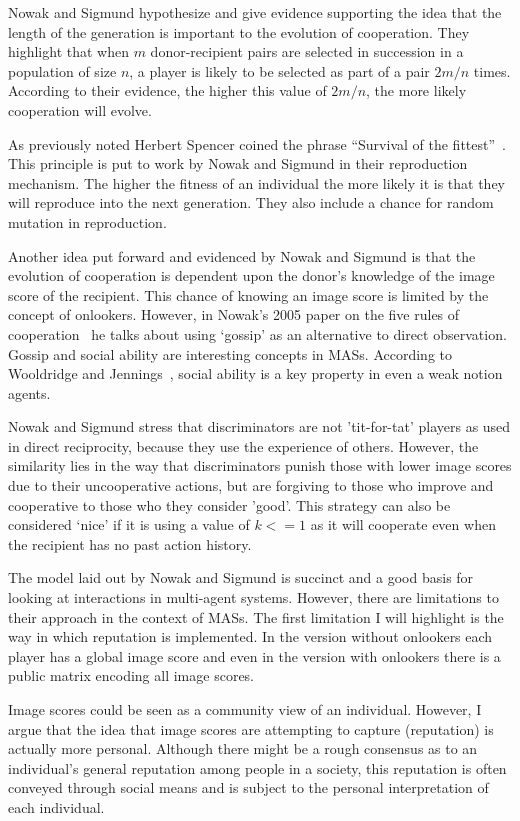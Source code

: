 \documentclass[]{final_report}
\begin{document}
Nowak and Sigmund hypothesize and give evidence supporting the idea that the length of the generation is important to the evolution of cooperation. They highlight that when $m$ donor-recipient pairs are selected in succession in a population of size $n$, a player is likely to be selected as part of a pair $2m/n$ times. According to their evidence, the higher this value of $2m/n$, the more likely cooperation will evolve.\par
As previously noted Herbert Spencer coined the phrase ``Survival of the fittest''~\cite{spencer1864principles}. This principle is put to work by Nowak and Sigmund in their reproduction mechanism. The higher the fitness of an individual the more likely it is that they will reproduce into the next generation. They also include a chance for random mutation in  reproduction.\par
Another idea put forward and evidenced by Nowak and Sigmund is that the evolution of cooperation is dependent upon the donor's knowledge of the image score of the recipient. This chance of knowing an image score is limited by the concept of onlookers. However, in Nowak's 2005 paper on the five rules of cooperation~\cite{five_rules_coop} he talks about using `gossip' as an alternative to direct observation. Gossip and social ability are interesting concepts in MASs. According to Wooldridge and Jennings~\cite{wooldridge_jennings_1995}, social ability is a key property in even a weak notion agents.\par
Nowak and Sigmund stress that discriminators are not 'tit-for-tat' players as used in direct reciprocity, because they use the experience of others. However, the similarity lies in the way that discriminators punish those with lower image scores due to their uncooperative actions, but are forgiving to those who improve and cooperative to those who they consider 'good'. This strategy can also be considered `nice' if it is using a value of $k<=1$ as it will cooperate even when the recipient has no past action history.\par
The model laid out by Nowak and Sigmund is succinct and a good basis for looking at interactions in multi-agent systems. However, there are limitations to their approach in the context of MASs. The first limitation I will highlight is the way in which reputation is implemented. In the version without onlookers each player has a global image score and even in the version with onlookers there is a public matrix encoding all image scores.\par
Image scores could be seen as a community view of an individual. However, I argue that the idea that image scores are attempting to capture (reputation) is actually more personal. Although there might be a rough consensus as to an individual's general reputation among people in a society, this reputation is often conveyed through social means and is subject to the personal interpretation of each individual.\par
\end{document}
